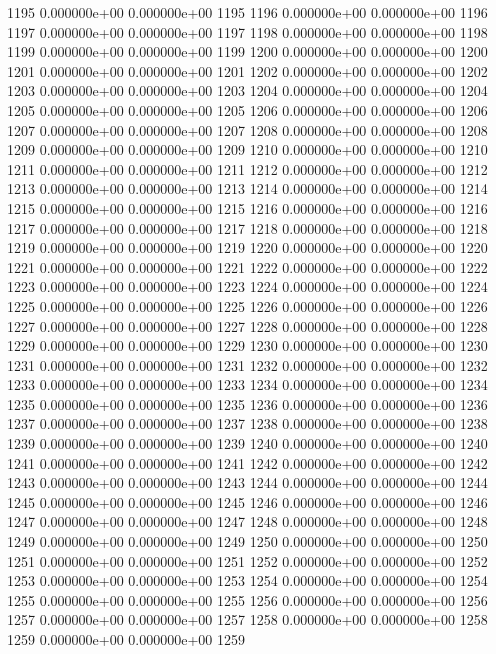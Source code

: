 \documentclass{article}
\begin{document}
\begin{Schunk}
\begin{Soutput}
1195   0.000000e+00   0.000000e+00 1195
1196   0.000000e+00   0.000000e+00 1196
1197   0.000000e+00   0.000000e+00 1197
1198   0.000000e+00   0.000000e+00 1198
1199   0.000000e+00   0.000000e+00 1199
1200   0.000000e+00   0.000000e+00 1200
1201   0.000000e+00   0.000000e+00 1201
1202   0.000000e+00   0.000000e+00 1202
1203   0.000000e+00   0.000000e+00 1203
1204   0.000000e+00   0.000000e+00 1204
1205   0.000000e+00   0.000000e+00 1205
1206   0.000000e+00   0.000000e+00 1206
1207   0.000000e+00   0.000000e+00 1207
1208   0.000000e+00   0.000000e+00 1208
1209   0.000000e+00   0.000000e+00 1209
1210   0.000000e+00   0.000000e+00 1210
1211   0.000000e+00   0.000000e+00 1211
1212   0.000000e+00   0.000000e+00 1212
1213   0.000000e+00   0.000000e+00 1213
1214   0.000000e+00   0.000000e+00 1214
1215   0.000000e+00   0.000000e+00 1215
1216   0.000000e+00   0.000000e+00 1216
1217   0.000000e+00   0.000000e+00 1217
1218   0.000000e+00   0.000000e+00 1218
1219   0.000000e+00   0.000000e+00 1219
1220   0.000000e+00   0.000000e+00 1220
1221   0.000000e+00   0.000000e+00 1221
1222   0.000000e+00   0.000000e+00 1222
1223   0.000000e+00   0.000000e+00 1223
1224   0.000000e+00   0.000000e+00 1224
1225   0.000000e+00   0.000000e+00 1225
1226   0.000000e+00   0.000000e+00 1226
1227   0.000000e+00   0.000000e+00 1227
1228   0.000000e+00   0.000000e+00 1228
1229   0.000000e+00   0.000000e+00 1229
1230   0.000000e+00   0.000000e+00 1230
1231   0.000000e+00   0.000000e+00 1231
1232   0.000000e+00   0.000000e+00 1232
1233   0.000000e+00   0.000000e+00 1233
1234   0.000000e+00   0.000000e+00 1234
1235   0.000000e+00   0.000000e+00 1235
1236   0.000000e+00   0.000000e+00 1236
1237   0.000000e+00   0.000000e+00 1237
1238   0.000000e+00   0.000000e+00 1238
1239   0.000000e+00   0.000000e+00 1239
1240   0.000000e+00   0.000000e+00 1240
1241   0.000000e+00   0.000000e+00 1241
1242   0.000000e+00   0.000000e+00 1242
1243   0.000000e+00   0.000000e+00 1243
1244   0.000000e+00   0.000000e+00 1244
1245   0.000000e+00   0.000000e+00 1245
1246   0.000000e+00   0.000000e+00 1246
1247   0.000000e+00   0.000000e+00 1247
1248   0.000000e+00   0.000000e+00 1248
1249   0.000000e+00   0.000000e+00 1249
1250   0.000000e+00   0.000000e+00 1250
1251   0.000000e+00   0.000000e+00 1251
1252   0.000000e+00   0.000000e+00 1252
1253   0.000000e+00   0.000000e+00 1253
1254   0.000000e+00   0.000000e+00 1254
1255   0.000000e+00   0.000000e+00 1255
1256   0.000000e+00   0.000000e+00 1256
1257   0.000000e+00   0.000000e+00 1257
1258   0.000000e+00   0.000000e+00 1258
1259   0.000000e+00   0.000000e+00 1259

\end{Soutput}
\end{Schunk}
\end{document}
